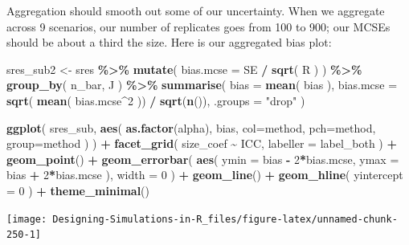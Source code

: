 \documentclass[
]{book}
\newenvironment{Shaded}{\begin{snugshade}}{\end{snugshade}}
\newcommand{\AttributeTok}[1]{\textcolor[rgb]{0.13,0.29,0.53}{#1}}
\newcommand{\DecValTok}[1]{\textcolor[rgb]{0.00,0.00,0.81}{#1}}
\newcommand{\FunctionTok}[1]{\textcolor[rgb]{0.13,0.29,0.53}{\textbf{#1}}}
\newcommand{\NormalTok}[1]{#1}
\newcommand{\OtherTok}[1]{\textcolor[rgb]{0.56,0.35,0.01}{#1}}
\newcommand{\SpecialCharTok}[1]{\textcolor[rgb]{0.81,0.36,0.00}{\textbf{#1}}}
\newcommand{\StringTok}[1]{\textcolor[rgb]{0.31,0.60,0.02}{#1}}
\begin{document}
Aggregation should smooth out some of our uncertainty.
When we aggregate across 9 scenarios, our number of replicates goes from 100 to 900; our MCSEs should be about a third the size.
Here is our aggregated bias plot:

\begin{Shaded}
\begin{Highlighting}[]
\NormalTok{sres\_sub2 }\OtherTok{\textless{}{-}} 
\NormalTok{  sres }\SpecialCharTok{\%\textgreater{}\%}
  \FunctionTok{mutate}\NormalTok{( }\AttributeTok{bias.mcse =}\NormalTok{ SE }\SpecialCharTok{/} \FunctionTok{sqrt}\NormalTok{( R ) ) }\SpecialCharTok{\%\textgreater{}\%}
  \FunctionTok{group\_by}\NormalTok{( n\_bar, J ) }\SpecialCharTok{\%\textgreater{}\%}
  \FunctionTok{summarise}\NormalTok{( }
    \AttributeTok{bias =} \FunctionTok{mean}\NormalTok{( bias ),}
    \AttributeTok{bias.mcse =} \FunctionTok{sqrt}\NormalTok{( }\FunctionTok{mean}\NormalTok{( bias.mcse}\SpecialCharTok{\^{}}\DecValTok{2}\NormalTok{ )) }\SpecialCharTok{/} \FunctionTok{sqrt}\NormalTok{(}\FunctionTok{n}\NormalTok{()),}
    \AttributeTok{.groups =} \StringTok{"drop"} 
\NormalTok{  )}

\FunctionTok{ggplot}\NormalTok{( sres\_sub, }\FunctionTok{aes}\NormalTok{( }\FunctionTok{as.factor}\NormalTok{(alpha), bias, }
                       \AttributeTok{col=}\NormalTok{method, }\AttributeTok{pch=}\NormalTok{method, }\AttributeTok{group=}\NormalTok{method ) ) }\SpecialCharTok{+}
  \FunctionTok{facet\_grid}\NormalTok{( size\_coef }\SpecialCharTok{\textasciitilde{}}\NormalTok{ ICC, }\AttributeTok{labeller =}\NormalTok{ label\_both ) }\SpecialCharTok{+}
  \FunctionTok{geom\_point}\NormalTok{() }\SpecialCharTok{+} 
  \FunctionTok{geom\_errorbar}\NormalTok{( }\FunctionTok{aes}\NormalTok{( }\AttributeTok{ymin =}\NormalTok{ bias }\SpecialCharTok{{-}} \DecValTok{2}\SpecialCharTok{*}\NormalTok{bias.mcse, }
                      \AttributeTok{ymax =}\NormalTok{ bias }\SpecialCharTok{+} \DecValTok{2}\SpecialCharTok{*}\NormalTok{bias.mcse ), }
                 \AttributeTok{width =} \DecValTok{0}\NormalTok{ ) }\SpecialCharTok{+}
  \FunctionTok{geom\_line}\NormalTok{() }\SpecialCharTok{+}
  \FunctionTok{geom\_hline}\NormalTok{( }\AttributeTok{yintercept =} \DecValTok{0}\NormalTok{ ) }\SpecialCharTok{+}
  \FunctionTok{theme\_minimal}\NormalTok{() }
\end{Highlighting}
\end{Shaded}

\begin{center}\texttt{[image: Designing-Simulations-in-R\_files/figure-latex/unnamed-chunk-250-1]} \end{center}
\end{document}
